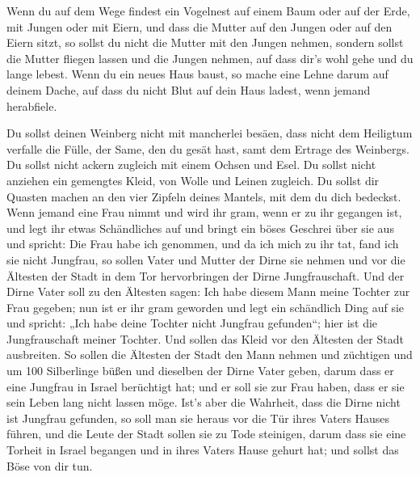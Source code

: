  Wenn du auf dem Wege findest ein Vogelnest auf einem Baum
oder auf der Erde, mit Jungen oder mit Eiern, und dass die Mutter auf
den Jungen oder auf den Eiern sitzt, so sollst du nicht die Mutter mit
den Jungen nehmen,  sondern sollst die Mutter fliegen
lassen und die Jungen nehmen, auf dass dir's wohl gehe und du lange
lebest.  Wenn du ein neues Haus baust, so mache eine Lehne
darum auf deinem Dache, auf dass du nicht Blut auf dein Haus ladest,
wenn jemand herabfiele.

 Du sollst deinen Weinberg nicht mit mancherlei besäen,
dass nicht dem Heiligtum verfalle die Fülle, der Same, den du gesät
hast, samt dem Ertrage des Weinbergs.  Du sollst nicht
ackern zugleich mit einem Ochsen und Esel.  Du sollst
nicht anziehen ein gemengtes Kleid, von Wolle und Leinen zugleich.
 Du sollst dir Quasten machen an den vier Zipfeln deines
Mantels, mit dem du dich bedeckst.  Wenn jemand eine Frau
nimmt und wird ihr gram, wenn er zu ihr gegangen ist, 
und legt ihr etwas Schändliches auf und bringt ein böses Geschrei über
sie aus und spricht: Die Frau habe ich genommen, und da ich mich zu ihr
tat, fand ich sie nicht Jungfrau,  so sollen Vater und
Mutter der Dirne sie nehmen und vor die Ältesten der Stadt in dem Tor
hervorbringen der Dirne Jungfrauschaft.  Und der Dirne
Vater soll zu den Ältesten sagen: Ich habe diesem Mann meine Tochter zur
Frau gegeben; nun ist er ihr gram geworden  und legt ein
schändlich Ding auf sie und spricht: „Ich habe deine Tochter nicht
Jungfrau gefunden``; hier ist die Jungfrauschaft meiner Tochter. Und
sollen das Kleid vor den Ältesten der Stadt ausbreiten. 
So sollen die Ältesten der Stadt den Mann nehmen und züchtigen
 und um 100 Silberlinge büßen und dieselben der Dirne
Vater geben, darum dass er eine Jungfrau in Israel berüchtigt hat; und
er soll sie zur Frau haben, dass er sie sein Leben lang nicht lassen
möge.  Ist's aber die Wahrheit, dass die Dirne nicht ist
Jungfrau gefunden,  so soll man sie heraus vor die Tür
ihres Vaters Hauses führen, und die Leute der Stadt sollen sie zu Tode
steinigen, darum dass sie eine Torheit in Israel begangen und in ihres
Vaters Hause gehurt hat; und sollst das Böse von dir tun.

